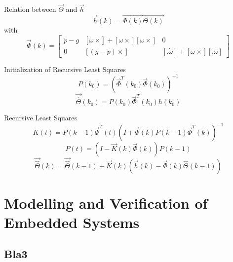 Relation between $\vec{\Theta}$ and $\vec{h}$
\begin{equation}
	\vec{h}(k) = \vec{\Phi(k)} \vec{\Theta(k)}
\end{equation}
with
\begin{equation}
	\vec{\Phi}(k) = 
	\begin{bmatrix}
		\ddot p - g	& [\dot \omega \times] + [\omega \times] [\omega \times]	& 0 \\
		0			& [(g - \ddot p) \times]									& [. \dot \omega] + [\omega \times] [. \omega]
	\end{bmatrix}
\end{equation}

Initialization of Recursive Least Squares
\begin{equation}
	P(k_0) = \left( \vec{\Phi}^T(k_0) \vec{\Phi}(k_0) \right)^{-1}
\end{equation}
\begin{equation}
	\vec{\hat \Theta} (k_0) = P(k_0) \vec{\Phi}^T(k_0) h(k_0)
\end{equation}

Recursive Least Squares
\begin{equation}
	K(t) = P(k-1) \vec{\Phi}^T(t) (I + \vec{\Phi}(k) P(k - 1) \vec{\Phi}^T(k))^{-1}
\end{equation}
\begin{equation}
	P(t) = (I - \vec{K}(k) \vec{\Phi}(k)) P(k - 1)
\end{equation}
\begin{equation}
	\vec{\hat \Theta}(k)=\vec{ \hat \Theta}(k - 1) + \vec{K}(k) (\vec{h}(k) - \vec{\Phi}(k) \hat \Theta(k - 1))
\end{equation}

\chapter{Modelling and Verification of Embedded Systems}

\section{Bla3}
\label{sec:bla3}
\lipsum[1] 

